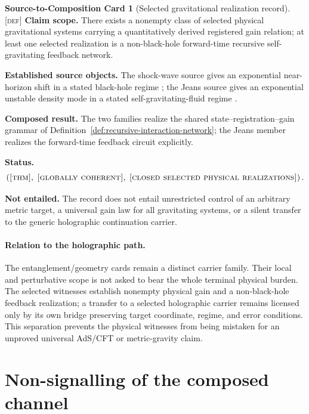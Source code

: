 \documentclass[11pt]{article}
\newcommand{\Defn}{\textsc{[def]}}
\theoremstyle{definition}
\newtheorem{compositioncard}{Source-to-Composition Card}
\begin{document}
\begin{compositioncard}[Selected gravitational realization record]
\label{card:terminal-realization-record}
\Defn{}
\textbf{Claim scope.} There exists a nonempty class of selected physical
gravitational systems carrying a quantitatively derived registered gain relation;
at least one selected realization is a non-black-hole forward-time recursive
self-gravitating feedback network.

\textbf{Established source objects.} The shock-wave source gives an exponential
near-horizon shift in a stated black-hole regime
\cite{S_DraytHooft1985,S_ShenkerStanford2014}; the Jeans source gives an
exponential unstable density mode in a stated self-gravitating-fluid regime
\cite{S_Jeans1902,S_BinneyTremaine2008,S_Chavanis2010}.

\textbf{Composed result.} The two families realize the shared
state--registration--gain grammar of
Definition~\ref{def:recursive-interaction-network}; the Jeans member realizes
the forward-time feedback circuit explicitly.

\textbf{Status.}
\begin{equation}
\left(
\textsc{[thm]},\;
\textsc{[globally coherent]},\;
\textsc{[closed selected physical realizations]}
\right).
\label{eq:terminal-realization-status}
\end{equation}

\textbf{Not entailed.} The record does not entail unrestricted control of an
arbitrary metric target, a universal gain law for all gravitating systems, or a
silent transfer to the generic holographic continuation carrier.
\end{compositioncard}

\paragraph{Relation to the holographic path.}
The entanglement/geometry cards remain a distinct carrier family.  Their local
and perturbative scope is not asked to bear the whole terminal physical burden.
The selected witnesses establish nonempty physical gain and a non-black-hole
feedback realization; a transfer to a selected holographic carrier remains
licensed only by its own bridge preserving target coordinate, regime, and error
conditions.  This separation prevents the physical witnesses from being mistaken
for an unproved universal AdS/CFT or metric-gravity claim.


\section{Non-signalling of the composed channel}
\label{supp:nosignal}
\end{document}
